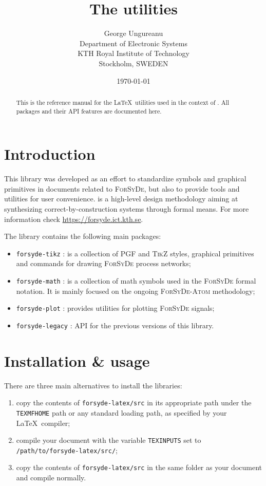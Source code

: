 \documentclass[10pt]{article}
\title{The \ForSyDeLaTeX utilities}
\author{
  George Ungureanu \\
  Department of Electronic Systems\\
  KTH Royal Institute of Technology\\
  Stockholm, SWEDEN
}
\date{\today}
\begin{document}
\maketitle
\reversemarginpar

\begin{abstract}
This is the reference manual for the \LaTeX\ utilities used in the context of \ForSyDe. All packages and their API features are documented here.
\end{abstract}

\section{Introduction}

This library was developed as an effort to standardize symbols and graphical primitives in documents related to \textsc{ForSyDe}, but also to provide tools and utilities for user convenience. \ForSyDe is a high-level design methodology aiming at synthesizing correct-by-construction systems through formal means. For more information check \url{https://forsyde.ict.kth.se}.

The library contains the following main packages:
\begin{itemize}
\item \texttt{forsyde-tikz} : is a collection of \textsc{PGF} and \textsc{TikZ} styles, graphical primitives and commands for drawing \textsc{ForSyDe} process networks;
\item \texttt{forsyde-math} : is a collection of math symbols used in the \textsc{ForSyDe} formal notation. It is mainly focused on the ongoing \textsc{ForSyDe-Atom} methodology;
\item \texttt{forsyde-plot} : provides utilities for plotting \textsc{ForSyDe} signals;
\item \texttt{forsyde-legacy} : API for the previous versions of this library.
\end{itemize}

\section{Installation \& usage}

There are three main alternatives to install the libraries:

\begin{enumerate}
\item copy the contents of \texttt{forsyde-latex/src} in its appropriate path under the \texttt{TEXMFHOME} path or any standard loading path, as specified by your \LaTeX\ compiler;
\item compile your document with the variable \texttt{TEXINPUTS} set to \texttt{/path/to/forsyde-latex/src/}; %
\item copy the contents of \texttt{forsyde-latex/src} in the same folder as your document and compile normally.
\end{enumerate}
\end{document}
